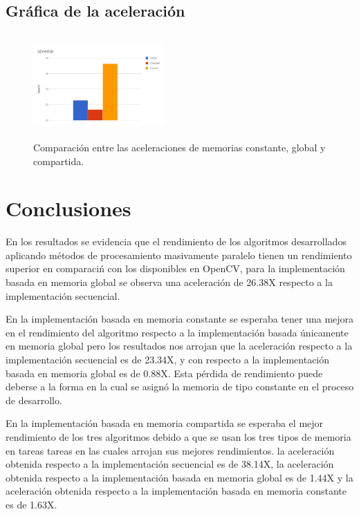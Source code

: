 \documentclass[journal]{IEEEtran}
\begin{document}
\subsection{Gr\'afica de la aceleraci\'on}
\begin{figure}[h]
    \centering
    \includegraphics[width=5cm, height=4cm]{speedup.png}
    \caption{Comparaci\'on entre las aceleraciones de memorias constante, global y compartida.}
    \label{fig:my_label6}
\end{figure}


\section{Conclusiones}
En los resultados se evidencia que  el rendimiento de los algoritmos desarrollados  aplicando m\'etodos de procesamiento masivamente paralelo tienen un rendimiento superior en comparaci\'n con los disponibles en OpenCV, para la implementaci\'on basada en memoria global se observa una aceleración de 26.38X respecto a la implementación secuencial.

En la implementación basada en memoria constante se esperaba tener una mejora en el rendimiento del algoritmo respecto a la implementaci\'on basada \'unicamente en memoria global pero los resultados nos arrojan que la aceleraci\'on respecto a la implementaci\'on secuencial es de 23.34X, y con respecto a la implementaci\'on basada en memoria global es de 0.88X. Esta p\'erdida de rendimiento puede deberse a la forma en la cual se asign\'o la memoria de tipo constante en el proceso de desarrollo.

En la implementaci\'on basada en memoria compartida se esperaba el mejor rendimiento de los tres algoritmos debido a que se usan los tres tipos de memoria en tareas tareas en las cuales arrojan sus mejores rendimientos. la aceleración obtenida respecto a la implementaci\'on secuencial es de 38.14X, la aceleraci\'on obtenida respecto a la implementaci\'on basada en memoria global es de 1.44X y la aceleraci\'on obtenida respecto a la implementaci\'on basada en memoria constante es de 1.63X. 
\end{document}
